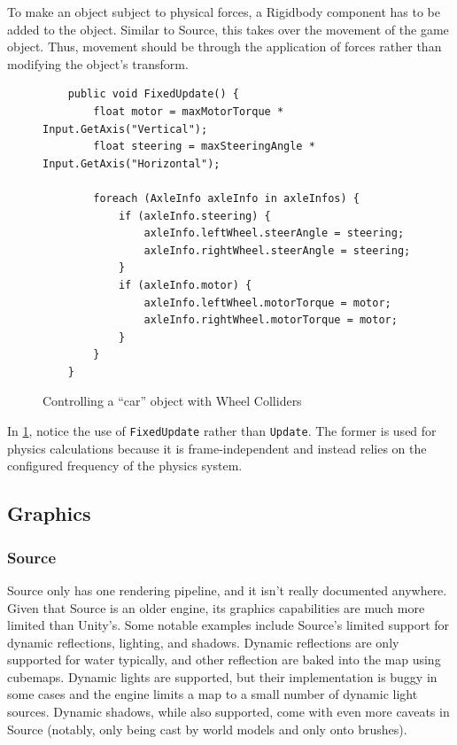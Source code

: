 \documentclass[a4paper, 12pt]{scrartcl}
\begin{document}
To make an object subject to physical forces, a Rigidbody component has to be added to the object. Similar to Source, this takes over the movement of the game object. Thus, movement should be through the application of forces rather than modifying the object's transform.

\begin{figure}[!htb]
  \begin{verbatim}
    public void FixedUpdate() {
        float motor = maxMotorTorque * Input.GetAxis("Vertical");
        float steering = maxSteeringAngle * Input.GetAxis("Horizontal");

        foreach (AxleInfo axleInfo in axleInfos) {
            if (axleInfo.steering) {
                axleInfo.leftWheel.steerAngle = steering;
                axleInfo.rightWheel.steerAngle = steering;
            }
            if (axleInfo.motor) {
                axleInfo.leftWheel.motorTorque = motor;
                axleInfo.rightWheel.motorTorque = motor;
            }
        }
    }
  \end{verbatim}
  \caption{Controlling a ``car'' object with Wheel Colliders}
  \label{fig:unity_wheels}
\end{figure}

In \cref{fig:unity_wheels}, notice the use of \texttt{FixedUpdate} rather than \texttt{Update}. The former is used for physics calculations because it is frame-independent and instead relies on the configured frequency of the physics system.

\subsection{Graphics}
\subsubsection{Source}
Source only has one rendering pipeline, and it isn't really documented anywhere. Given that Source is an older engine, its graphics capabilities are much more limited than Unity's. Some notable examples include Source's limited support for dynamic reflections, lighting, and shadows. Dynamic reflections are only supported for water typically, and other reflection are baked into the map using cubemaps. Dynamic lights are supported, but their implementation is buggy in some cases and the engine limits a map to a small number of dynamic light sources. Dynamic shadows, while also supported, come with even more caveats in Source (notably, only being cast by world models and only onto brushes).
\end{document}
